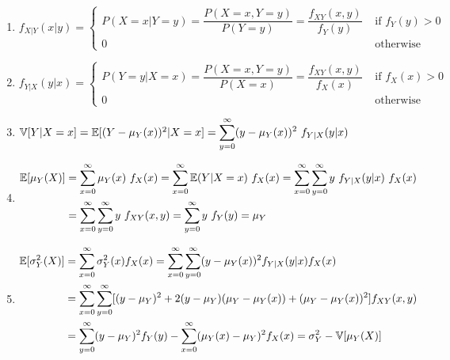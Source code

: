 \begin{enumerate}[resume*=calcrulesrv]
    \item
    $
        f _{X|Y} (x|y)
        = \begin{cases}
            P(X = x|Y = y)
            = \dfrac{P(X = x, Y = y)} {P(Y = y) }
            = \dfrac{f _{X Y} (x, y)} {f_Y (y) } & \text{ if } f _Y (y) > 0 \\
            0 & \text{ otherwise}
        \end{cases}
    $
    \hfill \cite{statistics/book/Statistics-for-Data-Scientists/Maurits-Kaptein}

    \item
    $
        f _{Y|X} (y|x)
        = \begin{cases}
            P(Y = y|X = x)
            = \dfrac{P(X = x, Y = y)} {P(X = x) }
            = \dfrac{f _{X Y} (x, y)} {f_X (x) } & \text{ if } f _X (x) > 0 \\
            0 & \text{ otherwise}
        \end{cases}
    $
    \hfill \cite{statistics/book/Statistics-for-Data-Scientists/Maurits-Kaptein}

    \item
    $
        \mathbb{V}[Y |X = x]
        = \mathbb{E}[(Y - \mu_Y (x))^2|X = x]
        = \displaystyle\sum^\infty_{y=0} (y - \mu_Y (x))^2\ f_{Y |X} (y|x)
    $
    \hfill \cite{statistics/book/Statistics-for-Data-Scientists/Maurits-Kaptein}

    \item
    $
        \begin{aligned}
           \mbbE[\mu_Y (X)]
            &= \dsum^\infty_{x=0} \mu_Y (x)\ f_X (x)
            = \dsum^\infty_{x=0} \mbbE(Y |X = x)\ f_X (x)
            = \dsum^\infty_{x=0} \dsum^\infty_{y=0} y\ f_{Y |X} (y|x)\ f_X (x) \\
            &= \dsum^\infty_{x=0} \dsum^\infty_{y=0} y\ f_{X Y} (x, y)
            = \dsum^\infty_{y=0} y\ f_Y (y)
            = \mu_Y
        \end{aligned}
    $
    \hfill \cite{statistics/book/Statistics-for-Data-Scientists/Maurits-Kaptein}

    \item
    $
        \begin{aligned}
            \mathbb{E}[\sigma^2_Y (X)]
            &= \displaystyle\sum^\infty_{x=0} \sigma^2_Y (x) f_X (x)
            = \displaystyle\sum^\infty_{x=0} \displaystyle\sum^\infty_{y=0} (y - \mu_Y (x))^2 f_{Y |X} (y|x) f_X (x) \\
            &= \displaystyle\sum^\infty_{x=0} \displaystyle\sum^\infty_{y=0} [(y - \mu_Y )^2 + 2(y - \mu_Y )(\mu_Y - \mu_Y (x)) + (\mu_Y - \mu_Y (x))^2] f_{X Y} (x, y) \\
            &= \displaystyle\sum^\infty_{y=0} (y - \mu_Y )^2 f_Y (y) - \displaystyle\sum^\infty_{x=0} (\mu_Y (x) - \mu_Y )^2 f_X (x)
            = \sigma^2_Y - \mathbb{V}[\mu_Y (X)]
        \end{aligned}
    $
    \hfill \cite{statistics/book/Statistics-for-Data-Scientists/Maurits-Kaptein}
\end{enumerate}



